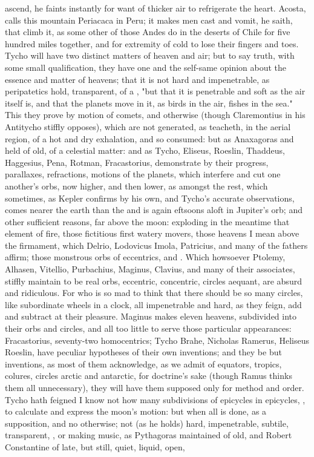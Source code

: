 {ascend, he faints instantly for want of thicker air to refrigerate the heart. Acosta,  calls this mountain Periacaca in Peru; it makes men cast and vomit, he saith, that climb it, as some other of those Andes do in the deserts of Chile for five hundred miles together, and for extremity of cold to lose their fingers and toes. Tycho will have two distinct matters of heaven and air; but to say truth, with some small qualification, they have one and the self-same opinion about the essence and matter of heavens; that it is not hard and impenetrable, as peripatetics hold, transparent, of a , "but that it is penetrable and soft as the air itself is, and that the planets move in it, as birds in the air, fishes in the sea." This they prove by motion of comets, and otherwise (though Claremontius in his Antitycho stiffly opposes), which are not generated, as \Aristotle{} teacheth, in the aerial region, of a hot and dry exhalation, and so consumed: but as Anaxagoras and \Democritus{} held of old, of a celestial matter: and as Tycho, Eliseus, Roeslin, Thaddeus, Haggesius, Pena, Rotman, Fracastorius, demonstrate by their progress, parallaxes, refractions, motions of the planets, which interfere and cut one another's orbs, now higher, and then lower, as  amongst the rest, which sometimes, as Kepler confirms by his own, and Tycho's accurate observations, comes nearer the earth than the  and is again eftsoons aloft in Jupiter's orb; and other sufficient reasons, far above the moon: exploding in the meantime that element of fire, those fictitious first watery movers, those heavens I mean above the firmament, which Delrio, Lodovicus Imola, Patricius, and many of the fathers affirm; those monstrous orbs of eccentrics, and . Which howsoever Ptolemy, Alhasen, Vitellio, Purbachius, Maginus, Clavius, and many of their associates, stiffly maintain to be real orbs, eccentric, concentric, circles aequant, \etc{} are absurd and ridiculous. For who is so mad to think that there should be so many circles, like subordinate wheels in a clock, all impenetrable and hard, as they feign, add and subtract at their pleasure. Maginus makes eleven heavens, subdivided into their orbs and circles, and all too little to serve those particular appearances: Fracastorius, seventy-two homocentrics; Tycho Brahe, Nicholas Ramerus, Heliseus Roeslin, have peculiar hypotheses of their own inventions; and they be but inventions, as most of them acknowledge, as we admit of equators, tropics, colures, circles arctic and antarctic, for doctrine's sake (though Ramus thinks them all unnecessary), they will have them supposed only for method and order. Tycho hath feigned I know not how many subdivisions of epicycles in epicycles, \etc{}, to calculate and express the moon's motion: but when all is done, as a supposition, and no otherwise; not (as he holds) hard, impenetrable, subtile, transparent, \etc{}, or making music, as Pythagoras maintained of old, and Robert Constantine of late, but still, quiet, liquid, open, \etc{}

}
